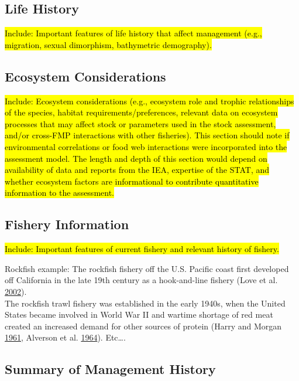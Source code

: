 \documentclass[12pt,]{article}
\begin{document}
\subsection{Life History}\label{life-history}

\hl{Include: Important features of life history that affect management (e.g., migration, 
sexual dimorphism, bathymetric demography).}

\subsection{Ecosystem Considerations}\label{ecosystem-considerations-1}

\hl{Include: Ecosystem considerations (e.g., ecosystem role and trophic relationships of 
the species, habitat requirements/preferences, relevant data on ecosystem processes 
that may affect stock or parameters used in the stock assessment, and/or cross-FMP 
interactions with other fisheries). This section should note if environmental 
correlations or food web interactions were incorporated into the assessment model. 
The length and depth of this section would depend on availability of data and reports 
from the IEA, expertise of the STAT, and whether ecosystem factors are informational 
to contribute quantitative information to the assessment.}

\subsection{Fishery Information}\label{fishery-information}

\hl{Include: Important features of current fishery and relevant history of fishery.}

Rockfish example: The rockfish fishery off the U.S. Pacific coast first
developed off California in the late 19th century as a hook-and-line
fishery (Love et al. \protect\hyperlink{ref-Love2002}{2002}).\\
The rockfish trawl fishery was established in the early 1940s, when the
United States became involved in World War II and wartime shortage of
red meat created an increased demand for other sources of protein (Harry
and Morgan \protect\hyperlink{ref-Harry1961}{1961}, Alverson et al.
\protect\hyperlink{ref-Alverson1964}{1964}). Etc\ldots{}.

\subsection{Summary of Management
History}\label{summary-of-management-history}
\end{document}
